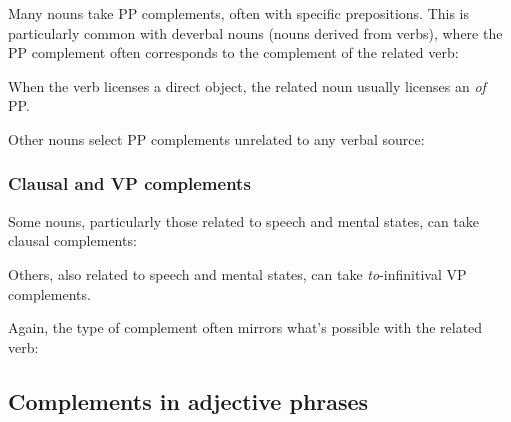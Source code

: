 Many nouns take PP complements, often with specific prepositions. This is particularly common with deverbal nouns (nouns derived from verbs), where the PP complement often corresponds to the complement of the related verb:

\ea
    \z
\z

\noindent When the verb licenses a direct object, the related noun usually licenses an \textit{of} PP.

\ea
    \z
\z

\noindent Other nouns select PP complements unrelated to any verbal source:

\ea
    \z
\z

\subsubsection{Clausal and VP complements}

Some nouns, particularly those related to speech and mental states, can take clausal complements:

\ea
    \z
\z

\noindent Others, also related to speech and mental states, can take \textit{to}-infinitival VP complements.
\ea
    \z
\z

\noindent Again, the type of complement often mirrors what's possible with the related verb:

\ea
    \z
\z

\subsection{Complements in adjective phrases}

